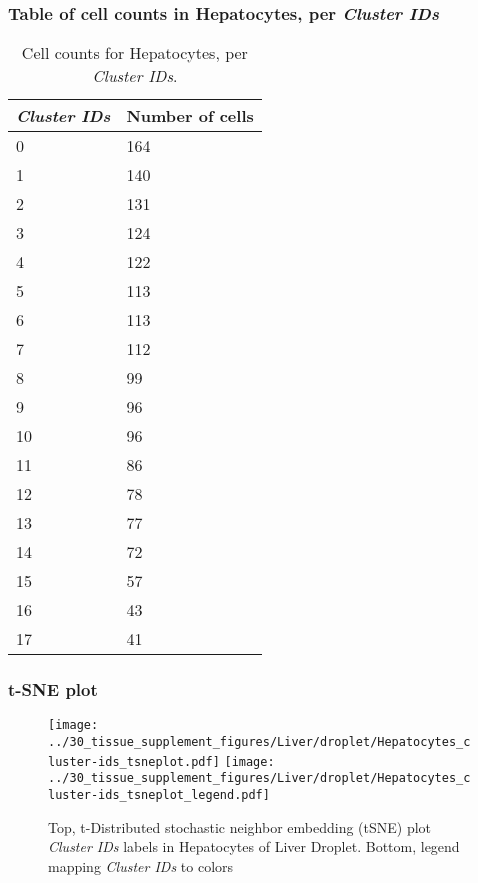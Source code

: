 \subsubsection{Table of cell counts in Hepatocytes, per \emph{Cluster IDs}}\begin{table}[h]
\centering
\label{my-label}
\begin{tabular}{@{}ll@{}}
\toprule

\emph{Cluster IDs}& Number of cells \\ \midrule
0 & 164 \\

1 & 140 \\

2 & 131 \\

3 & 124 \\

4 & 122 \\

5 & 113 \\

6 & 113 \\

7 & 112 \\

8 & 99 \\

9 & 96 \\

10 & 96 \\

11 & 86 \\

12 & 78 \\

13 & 77 \\

14 & 72 \\

15 & 57 \\

16 & 43 \\

17 & 41 \\
\bottomrule
\end{tabular}
\caption{Cell counts for Hepatocytes, per \emph{Cluster IDs}.}
\end{table}

\clearpage
\subsubsection{t-SNE plot}
\begin{figure}[h]
\centering
\texttt{[image: ../30\_tissue\_supplement\_figures/Liver/droplet/Hepatocytes\_cluster-ids\_tsneplot.pdf]}
\texttt{[image: ../30\_tissue\_supplement\_figures/Liver/droplet/Hepatocytes\_cluster-ids\_tsneplot\_legend.pdf]}
\caption{Top, t-Distributed stochastic neighbor embedding (tSNE) plot  \emph{Cluster IDs} labels in Hepatocytes of Liver Droplet. Bottom, legend mapping \emph{Cluster IDs} to colors}
\end{figure}


